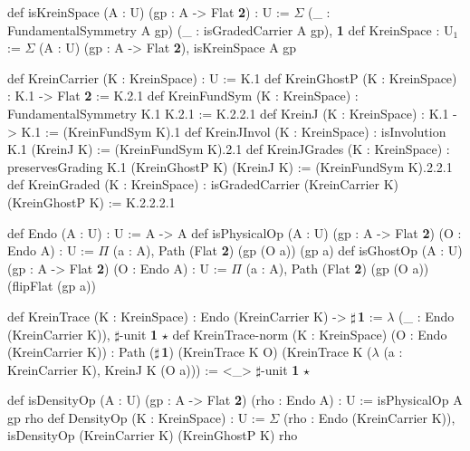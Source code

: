 \documentclass{article}
\begin{document}
def isKreinSpace (A : U) (gp : A -> Flat \textbf{2}) : U
\hspace*{1.5em}:= $\Sigma$ (\_ : FundamentalSymmetry A gp)
\hspace*{3.5em}(\_ : isGradedCarrier A gp), \textbf{1}
def KreinSpace : U$_1$
\hspace*{1.5em}:= $\Sigma$ (A : U) (gp : A -> Flat \textbf{2}), isKreinSpace A gp

def KreinCarrier (K : KreinSpace) : U              := K.1
def KreinGhostP  (K : KreinSpace) : K.1 -> Flat \textbf{2} := K.2.1
def KreinFundSym (K : KreinSpace) : FundamentalSymmetry K.1 K.2.1 := K.2.2.1
def KreinJ       (K : KreinSpace) : K.1 -> K.1    := (KreinFundSym K).1
def KreinJInvol  (K : KreinSpace) : isInvolution K.1 (KreinJ K) := (KreinFundSym K).2.1
def KreinJGrades (K : KreinSpace) : preservesGrading K.1 (KreinGhostP K) (KreinJ K)
\hspace*{1.5em}:= (KreinFundSym K).2.2.1
def KreinGraded  (K : KreinSpace) : isGradedCarrier (KreinCarrier K) (KreinGhostP K)
\hspace*{1.5em}:= K.2.2.2.1

def Endo (A : U) : U := A -> A
def isPhysicalOp (A : U) (gp : A -> Flat \textbf{2}) (O : Endo A) : U
\hspace*{1.5em}:= $\Pi$ (a : A), Path (Flat \textbf{2}) (gp (O a)) (gp a)
def isGhostOp (A : U) (gp : A -> Flat \textbf{2}) (O : Endo A) : U
\hspace*{1.5em}:= $\Pi$ (a : A), Path (Flat \textbf{2}) (gp (O a)) (flipFlat (gp a))

def KreinTrace (K : KreinSpace) : Endo (KreinCarrier K) -> $\sharp$\,\textbf{1}
\hspace*{1.5em}:= $\lambda$ (\_ : Endo (KreinCarrier K)), $\sharp$-unit \textbf{1} $\star$
def KreinTrace-norm (K : KreinSpace) (O : Endo (KreinCarrier K))
\hspace*{2em}: Path ($\sharp$\,\textbf{1}) (KreinTrace K O)
\hspace*{5em}(KreinTrace K ($\lambda$ (a : KreinCarrier K), KreinJ K (O a)))
\hspace*{1.5em}:= <\_> $\sharp$-unit \textbf{1} $\star$

def isDensityOp (A : U) (gp : A -> Flat \textbf{2}) (rho : Endo A) : U
\hspace*{1.5em}:= isPhysicalOp A gp rho
def DensityOp (K : KreinSpace) : U
\hspace*{1.5em}:= $\Sigma$ (rho : Endo (KreinCarrier K)),
\hspace*{3.5em}isDensityOp (KreinCarrier K) (KreinGhostP K) rho
\end{document}
